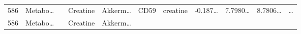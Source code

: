 \documentclass[
]{article}
\begin{document}
\begin{longtable}[]{@{}lllllllllll@{}}
\begin{minipage}[t]{0.03\columnwidth}
586\strut
\end{minipage} & \begin{minipage}[t]{0.07\columnwidth}\raggedright
Metabo\ldots{}\strut
\end{minipage} & \begin{minipage}[t]{0.07\columnwidth}\raggedright
\strut
\end{minipage} & \begin{minipage}[t]{0.09\columnwidth}\raggedright
Creatine\strut
\end{minipage} & \begin{minipage}[t]{0.07\columnwidth}\raggedright
Akkerm\ldots{}\strut
\end{minipage} & \begin{minipage}[t]{0.07\columnwidth}\raggedright
CD59\strut
\end{minipage} & \begin{minipage}[t]{0.09\columnwidth}\raggedright
creatine\strut
\end{minipage} & \begin{minipage}[t]{0.07\columnwidth}\raggedright
-0.187\ldots{}\strut
\end{minipage} & \begin{minipage}[t]{0.07\columnwidth}\raggedright
7.7980\ldots{}\strut
\end{minipage} & \begin{minipage}[t]{0.07\columnwidth}\raggedright
8.7806\ldots{}\strut
\end{minipage} & \begin{minipage}[t]{0.03\columnwidth}\raggedright
\ldots{}\strut
\end{minipage}\tabularnewline
\begin{minipage}[t]{0.03\columnwidth}\raggedright
586\strut
\end{minipage} & \begin{minipage}[t]{0.07\columnwidth}\raggedright
Metabo\ldots{}\strut
\end{minipage} & \begin{minipage}[t]{0.07\columnwidth}\raggedright
\strut
\end{minipage} & \begin{minipage}[t]{0.09\columnwidth}\raggedright
Creatine\strut
\end{minipage} & \begin{minipage}[t]{0.07\columnwidth}\raggedright
Akkerm\ldots{}\strut
\end{minipage} & \begin{minipage}[t]{0.07\columnwidth}\raggedright

\end{minipage}
\end{longtable}
\end{document}

